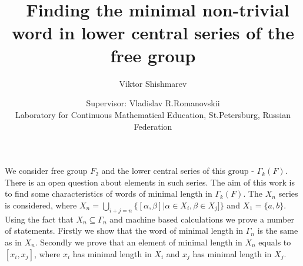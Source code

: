 \documentclass[a4paper, 11pt]{article}
\title{\textbf{ \ \\ \ 
\ \\ \ 
Finding the minimal non-trivial word in lower central series of the free group}}
\author{Viktor Shishmarev
\and Supervisor: Vladislav R.Romanovskii
\\Laboratory for Continuous Mathematical Education, St.Petersburg, Russian Federation}
\date{}
\theoremstyle{plain}
\theoremstyle{definition}
\begin{document}
\maketitle
We consider free group $F_2$ and the lower central series of this group - $\Gamma_k(F)$. There is an open question about elements in such series. The aim of this work is to find some characteristics of words of minimal length in  $\Gamma_k(F)$. The $X_n$ series is considered, where $X_n = \bigcup\limits_{i+j = n} \{ [\alpha, \beta] | \alpha \in X_i, \beta \in X_j]\}$ and $X_1 = \{a, b\}$.  Using the fact that $X_n \subseteq \Gamma_n$ and machine based calculations we prove a number of statements. Firstly we show that the word of minimal length in $\Gamma_n$ is the same as in $X_n$. Secondly we prove that an element of minimal length in $X_n$ equals to $[x_i, x_j]$, where $x_i$ has minimal length in $X_i$ and $x_j$ has minimal length in $X_j$.
\end{document}
